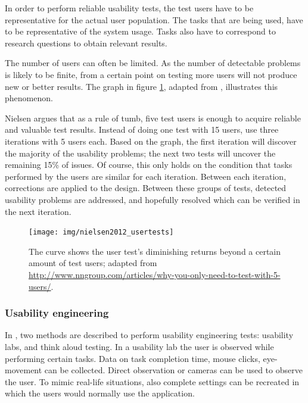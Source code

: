 In order to perform reliable usability tests, the test users have to be representative for the actual user population\cite{duval:2012:chi:evaluation, north:2006}. The tasks that are being used, have to be representative of the system usage. Tasks also have to correspond to research questions to obtain relevant results\cite{snyder:2003}.

The number of users can often be limited. As the number of detectable problems is likely to be finite, from a certain point on testing more users will not produce new or better results\cite{duval:2012:chi:evaluation, nielsen:2012:nngroup:diminishing_returns}. The graph in figure \ref{fig:nielsengraph}, adapted from \cite{nielsen:2012:nngroup:diminishing_returns}, illustrates this phenomenon.

Nielsen argues that as a rule of tumb, five test users is enough to acquire reliable and valuable test results. Instead of doing one test with 15 users, use three iterations with 5 users each. Based on the graph, the first iteration will discover the majority of the usability problems; the next two tests will uncover the remaining 15\% of issues. Of course, this only holds on the condition that tasks performed by the users are similar for each iteration. Between each iteration, corrections are applied to the design\cite{nielsen:2012:nngroup:diminishing_returns}. Between these groups of tests, detected usability problems are addressed, and hopefully resolved which can be verified in the next iteration.

\begin{figure}
	\begin{center}
		\texttt{[image: img/nielsen2012\_usertests]}
	\end{center}
	\caption{The curve shows the user test's diminishing returns beyond a certain amount of test users; adapted from \url{http://www.nngroup.com/articles/why-you-only-need-to-test-with-5-users/}.}
	\label{fig:nielsengraph}
\end{figure}


\subsubsection{Usability engineering}

In \cite{duval:2012:chi:evaluation}, two methods are described to perform usability engineering tests: usability labs, and think aloud testing. In a usability lab the user is observed while performing certain tasks. Data on task completion time, mouse clicks, eye-movement can be collected. Direct observation or cameras can be used to observe the user. To mimic real-life situations, also complete settings can be recreated in which the users would normally use the application\cite{duval:2012:chi:evaluation}.

